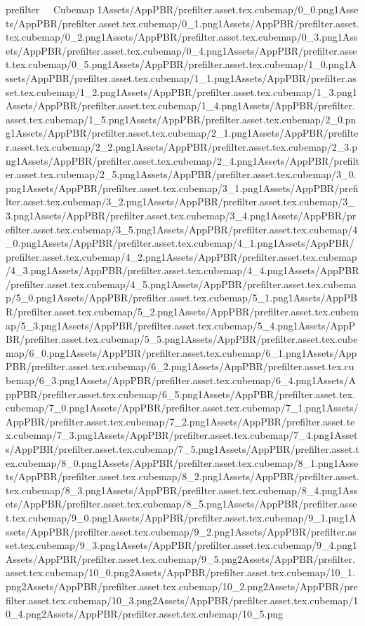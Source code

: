 	   prefilter               Cubemap   1   Assets/AppPBR/prefilter.asset.tex.cubemap/0_0.png1   Assets/AppPBR/prefilter.asset.tex.cubemap/0_1.png1   Assets/AppPBR/prefilter.asset.tex.cubemap/0_2.png1   Assets/AppPBR/prefilter.asset.tex.cubemap/0_3.png1   Assets/AppPBR/prefilter.asset.tex.cubemap/0_4.png1   Assets/AppPBR/prefilter.asset.tex.cubemap/0_5.png1   Assets/AppPBR/prefilter.asset.tex.cubemap/1_0.png1   Assets/AppPBR/prefilter.asset.tex.cubemap/1_1.png1   Assets/AppPBR/prefilter.asset.tex.cubemap/1_2.png1   Assets/AppPBR/prefilter.asset.tex.cubemap/1_3.png1   Assets/AppPBR/prefilter.asset.tex.cubemap/1_4.png1   Assets/AppPBR/prefilter.asset.tex.cubemap/1_5.png1   Assets/AppPBR/prefilter.asset.tex.cubemap/2_0.png1   Assets/AppPBR/prefilter.asset.tex.cubemap/2_1.png1   Assets/AppPBR/prefilter.asset.tex.cubemap/2_2.png1   Assets/AppPBR/prefilter.asset.tex.cubemap/2_3.png1   Assets/AppPBR/prefilter.asset.tex.cubemap/2_4.png1   Assets/AppPBR/prefilter.asset.tex.cubemap/2_5.png1   Assets/AppPBR/prefilter.asset.tex.cubemap/3_0.png1   Assets/AppPBR/prefilter.asset.tex.cubemap/3_1.png1   Assets/AppPBR/prefilter.asset.tex.cubemap/3_2.png1   Assets/AppPBR/prefilter.asset.tex.cubemap/3_3.png1   Assets/AppPBR/prefilter.asset.tex.cubemap/3_4.png1   Assets/AppPBR/prefilter.asset.tex.cubemap/3_5.png1   Assets/AppPBR/prefilter.asset.tex.cubemap/4_0.png1   Assets/AppPBR/prefilter.asset.tex.cubemap/4_1.png1   Assets/AppPBR/prefilter.asset.tex.cubemap/4_2.png1   Assets/AppPBR/prefilter.asset.tex.cubemap/4_3.png1   Assets/AppPBR/prefilter.asset.tex.cubemap/4_4.png1   Assets/AppPBR/prefilter.asset.tex.cubemap/4_5.png1   Assets/AppPBR/prefilter.asset.tex.cubemap/5_0.png1   Assets/AppPBR/prefilter.asset.tex.cubemap/5_1.png1   Assets/AppPBR/prefilter.asset.tex.cubemap/5_2.png1   Assets/AppPBR/prefilter.asset.tex.cubemap/5_3.png1   Assets/AppPBR/prefilter.asset.tex.cubemap/5_4.png1   Assets/AppPBR/prefilter.asset.tex.cubemap/5_5.png1   Assets/AppPBR/prefilter.asset.tex.cubemap/6_0.png1   Assets/AppPBR/prefilter.asset.tex.cubemap/6_1.png1   Assets/AppPBR/prefilter.asset.tex.cubemap/6_2.png1   Assets/AppPBR/prefilter.asset.tex.cubemap/6_3.png1   Assets/AppPBR/prefilter.asset.tex.cubemap/6_4.png1   Assets/AppPBR/prefilter.asset.tex.cubemap/6_5.png1   Assets/AppPBR/prefilter.asset.tex.cubemap/7_0.png1   Assets/AppPBR/prefilter.asset.tex.cubemap/7_1.png1   Assets/AppPBR/prefilter.asset.tex.cubemap/7_2.png1   Assets/AppPBR/prefilter.asset.tex.cubemap/7_3.png1   Assets/AppPBR/prefilter.asset.tex.cubemap/7_4.png1   Assets/AppPBR/prefilter.asset.tex.cubemap/7_5.png1   Assets/AppPBR/prefilter.asset.tex.cubemap/8_0.png1   Assets/AppPBR/prefilter.asset.tex.cubemap/8_1.png1   Assets/AppPBR/prefilter.asset.tex.cubemap/8_2.png1   Assets/AppPBR/prefilter.asset.tex.cubemap/8_3.png1   Assets/AppPBR/prefilter.asset.tex.cubemap/8_4.png1   Assets/AppPBR/prefilter.asset.tex.cubemap/8_5.png1   Assets/AppPBR/prefilter.asset.tex.cubemap/9_0.png1   Assets/AppPBR/prefilter.asset.tex.cubemap/9_1.png1   Assets/AppPBR/prefilter.asset.tex.cubemap/9_2.png1   Assets/AppPBR/prefilter.asset.tex.cubemap/9_3.png1   Assets/AppPBR/prefilter.asset.tex.cubemap/9_4.png1   Assets/AppPBR/prefilter.asset.tex.cubemap/9_5.png2   Assets/AppPBR/prefilter.asset.tex.cubemap/10_0.png2   Assets/AppPBR/prefilter.asset.tex.cubemap/10_1.png2   Assets/AppPBR/prefilter.asset.tex.cubemap/10_2.png2   Assets/AppPBR/prefilter.asset.tex.cubemap/10_3.png2   Assets/AppPBR/prefilter.asset.tex.cubemap/10_4.png2   Assets/AppPBR/prefilter.asset.tex.cubemap/10_5.png